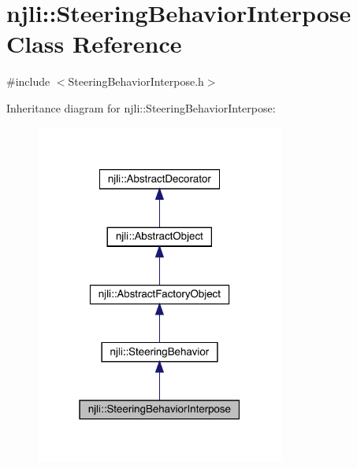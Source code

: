 \hypertarget{classnjli_1_1_steering_behavior_interpose}{}\section{njli\+:\+:Steering\+Behavior\+Interpose Class Reference}
\label{classnjli_1_1_steering_behavior_interpose}


{\ttfamily \#include $<$Steering\+Behavior\+Interpose.\+h$>$}



Inheritance diagram for njli\+:\+:Steering\+Behavior\+Interpose\+:\nopagebreak
\begin{figure}[H]
\begin{center}
\leavevmode
\includegraphics[width=232pt]{classnjli_1_1_steering_behavior_interpose__inherit__graph}
\end{center}
\end{figure}


